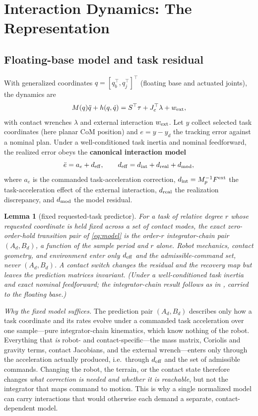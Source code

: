 \documentclass[journal]{IEEEtran}
\newtheorem{lemma}{Lemma}
\begin{document}
\section{Interaction Dynamics: The Representation}
\label{sec:rep}

\subsection{Floating-base model and task residual}
\label{sec:rep-model}

With generalized coordinates $q=[q_b^\top,q_j^\top]^\top$ (floating base and actuated joints), the dynamics are
\begin{equation}
M(q)\ddot q+h(q,\dot q)=S^\top\tau+J_c^\top\lambda+w_{\rm ext},
\label{eq:dyn}
\end{equation}
with contact wrenches $\lambda$ and external interaction $w_{\rm ext}$. Let $y$ collect selected task coordinates (here planar CoM position) and $e=y-y_d$ the tracking error against a nominal plan. Under a well-conditioned task inertia and nominal feedforward, the realized error obeys the \textbf{canonical interaction model}
\begin{equation}
\ddot e=a_e+d_{\rm eff},\qquad d_{\rm eff}=d_{\rm int}+d_{\rm real}+d_{\rm mod},
\label{eq:model}
\end{equation}
where $a_e$ is the commanded task-acceleration correction, $d_{\rm int}=M_p^{-1}F^{\rm ext}$ the task-acceleration effect of the external interaction, $d_{\rm real}$ the realization discrepancy, and $d_{\rm mod}$ the model residual.

\begin{lemma}[fixed requested-task predictor]
\label{lem:model}
For a task of relative degree $r$ whose requested coordinate is held fixed across a set of contact modes, the exact zero-order-hold transition pair of \eqref{eq:model} is the order-$r$ integrator-chain pair $(A_d,B_d)$, a function of the sample period and $r$ alone. Robot mechanics, contact geometry, and environment enter only $d_{\rm eff}$ and the admissible-command set, never $(A_d,B_d)$. A contact switch changes the residual and the recovery map but leaves the prediction matrices invariant. (Under a well-conditioned task inertia and exact nominal feedforward; the integrator-chain result follows as in \cite{r1}, carried to the floating base.)
\end{lemma}

\emph{Why the fixed model suffices.} The prediction pair $(A_d,B_d)$ describes only how a task coordinate and its rates evolve under a commanded task acceleration over one sample---pure integrator-chain kinematics, which know nothing of the robot. Everything that \emph{is} robot- and contact-specific---the mass matrix, Coriolis and gravity terms, contact Jacobians, and the external wrench---enters only through the acceleration actually produced, i.e.\ through $d_{\rm eff}$ and the set of admissible commands. Changing the robot, the terrain, or the contact state therefore changes \emph{what correction is needed and whether it is reachable}, but not the integrator that maps command to motion. This is why a single normalized model can carry interactions that would otherwise each demand a separate, contact-dependent model.
\end{document}
